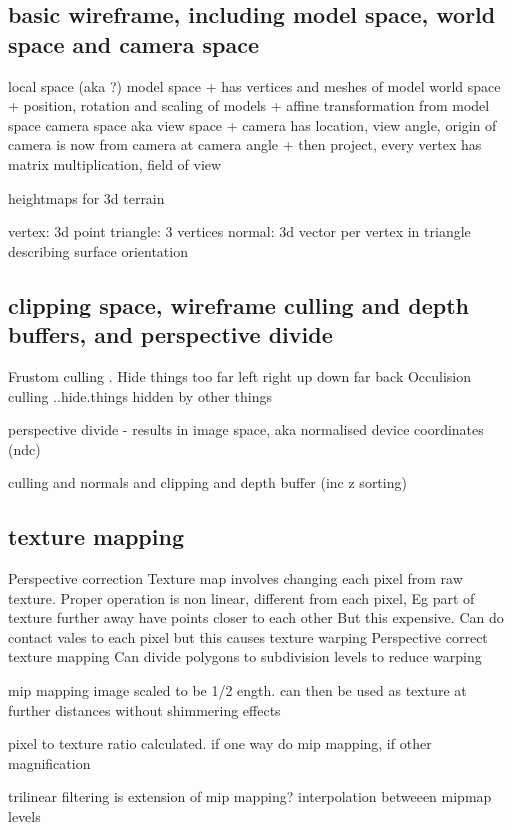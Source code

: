\subsection{basic wireframe, including model space, world space and camera space}

local space (aka ?) model space
+ has vertices and meshes of model
world space
+ position, rotation and scaling of models
+ affine transformation from model space
camera space aka view space
+ camera has location, view angle, origin of camera is now from camera at camera angle
+ then project, every vertex has matrix multiplication, field of view


heightmaps for 3d terrain

vertex: 3d point
triangle: 3 vertices
normal: 3d vector per vertex in triangle describing surface orientation

\subsection{clipping space, wireframe culling and depth buffers, and perspective divide}

Frustom culling . Hide things too far left right up down far back
Occulision culling ..hide.things hidden by other things

perspective divide - results in image space, aka normalised device coordinates (ndc)


culling and normals and clipping and depth buffer (inc z sorting)

\subsection{texture mapping}

Perspective correction
Texture map involves changing each pixel from raw texture. Proper operation is non linear, different from each pixel, Eg part of texture further away have points closer to each other
But this expensive. Can do contact vales to each pixel but this causes texture warping
Perspective correct texture mapping
Can divide polygons to subdivision levels to reduce warping

mip mapping
image scaled to be 1/2 ength. can then be used as texture  at further distances without shimmering effects

pixel to texture ratio calculated. if one way do mip mapping, if other magnification

trilinear filtering is extension of mip mapping? interpolation betweeen mipmap levels


